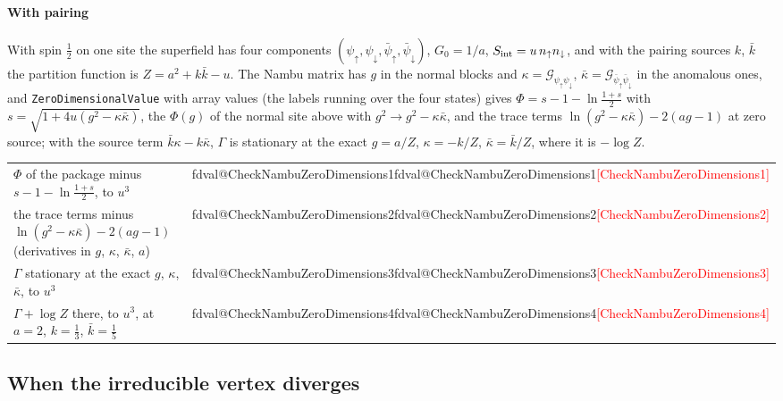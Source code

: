 \documentclass[11pt,a4paper]{article}
\makeatletter
\newcommand{\pkg}[1]{\texttt{#1}}
\newcommand{\val}[1]{\ifcsname fdval@#1\endcsname\csname fdval@#1\endcsname\else\textcolor{red}{[#1]}\fi}
\makeatother
\begin{document}
\paragraph{With pairing} With spin $\frac12$ on one site the superfield has four components $(\psi_\uparrow,\psi_\downarrow,
\bar\psi_\uparrow,\bar\psi_\downarrow)$, $G_0=1/a$, $S_{\rm int}=u\,n_\uparrow n_\downarrow$, and with the pairing sources $k$, $\bar k$ the
partition function is $Z=a^2+k\bar k-u$. The Nambu matrix has $g$ in the normal blocks and $\kappa=\mathcal G_{\psi_\uparrow\psi_\downarrow}$,
$\bar\kappa=\mathcal G_{\bar\psi_\uparrow\bar\psi_\downarrow}$ in the anomalous ones, and \pkg{ZeroDimensionalValue} with array values (the labels
running over the four states) gives $\Phi=s-1-\ln\frac{1+s}2$ with $s=\sqrt{1+4u(g^2-\kappa\bar\kappa)}$, the $\Phi(g)$ of the normal site above with $g^2\to g^2-\kappa\bar\kappa$, and the trace terms $\ln(g^2-\kappa\bar\kappa)-2(ag-1)$ at zero source; with the source term
$\bar k\kappa-k\bar\kappa$, $\Gamma$ is stationary at the exact $g=a/Z$, $\kappa=-k/Z$, $\bar\kappa=\bar k/Z$, where it is $-\log Z$.
\begin{result}
\begin{tabular}{@{}l@{\quad}l@{}}
$\Phi$ of the package minus $s-1-\ln\frac{1+s}2$, to $u^3$ & \val{CheckNambuZeroDimensions1}\\
the trace terms minus $\ln(g^2-\kappa\bar\kappa)-2(ag-1)$ (derivatives in $g$, $\kappa$, $\bar\kappa$, $a$) & \val{CheckNambuZeroDimensions2}\\
$\Gamma$ stationary at the exact $g$, $\kappa$, $\bar\kappa$, to $u^3$ & \val{CheckNambuZeroDimensions3}\\
$\Gamma+\log Z$ there, to $u^3$, at $a=2$, $k=\frac13$, $\bar k=\frac15$ & \val{CheckNambuZeroDimensions4}
\end{tabular}
\end{result}

\subsection{When the irreducible vertex diverges}\label{sec:divergence}
\end{document}
